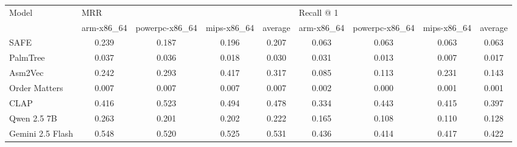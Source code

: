 \documentclass[conference,compsoc]{IEEEtran}
\begin{document}
{
    \renewcommand{\arraystretch}{1.3}

    \begin{table*}[!t]
    \centering
    \begin{tabular}{lcccccccc}
    \multirow{2}{*}{Model} & \multicolumn{4}{l}{MRR}                                & \multicolumn{4}{l}{Recall @ 1}                         \\
                           & arm-x86\_64 & powerpc-x86\_64 & mips-x86\_64 & average & arm-x86\_64 & powerpc-x86\_64 & mips-x86\_64 & average \\ \hline
    SAFE                   & 0.239       & 0.187           & 0.196        & 0.207   & 0.063       & 0.063           & 0.063        & 0.063   \\
    PalmTree               & 0.037       & 0.036           & 0.018        & 0.030   & 0.031       & 0.013           & 0.007        & 0.017   \\
    Asm2Vec                & 0.242       & 0.293           & 0.417        & 0.317   & 0.085       & 0.113           & 0.231        & 0.143   \\
    Order Matters          & 0.007       & 0.007           & 0.007        & 0.007   & 0.002       & 0.000           & 0.001        & 0.001   \\
    CLAP                   & 0.416       & 0.523           & 0.494        & 0.478   & 0.334       & 0.443           & 0.415        & 0.397   \\ \hline
    Qwen 2.5 7B            & 0.263       & 0.201           & 0.202        & 0.222   & 0.165       & 0.108           & 0.110        & 0.128   \\
    Gemini 2.5 Flash       & 0.548       & 0.520           & 0.525        & 0.531   & 0.436       & 0.414           & 0.417        & 0.422   \\ \hline
    \end{tabular}
    \end{table*}
}
\end{document}
